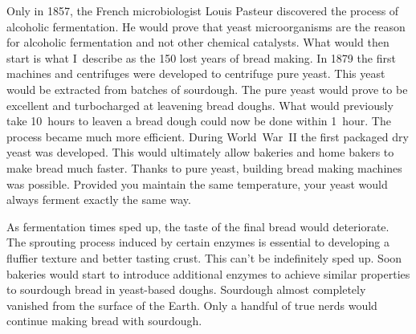 Only in 1857, the French microbiologist Louis Pasteur discovered
the process of alcoholic fermentation. He would prove that
yeast microorganisms are the reason for alcoholic fermentation
and not other chemical catalysts. What would then start is
what I~describe as the 150 lost years of bread making. In 1879
the first machines and centrifuges were developed to centrifuge
pure yeast. This yeast would be extracted from batches of sourdough.
The pure yeast would prove to be excellent and turbocharged
at leavening bread doughs. What would previously take 10~hours
to leaven a bread dough could now be done within 1~hour.
The process became much more efficient. During World~War~II
the first packaged dry yeast was developed. This would ultimately
allow bakeries and home bakers to make bread much faster.
Thanks to pure yeast, building bread making machines was
possible. Provided you maintain the same temperature,
your yeast would always ferment exactly the same way.

As fermentation
times sped up, the taste of the final bread would deteriorate.
The sprouting process induced by certain enzymes is essential
to developing a fluffier texture and better tasting crust. This
can't be indefinitely sped up. Soon bakeries would start
to introduce additional enzymes to achieve similar properties
to sourdough bread in yeast-based doughs. Sourdough almost completely
vanished from the surface of the Earth. Only a handful
of true nerds would continue making bread with sourdough.

